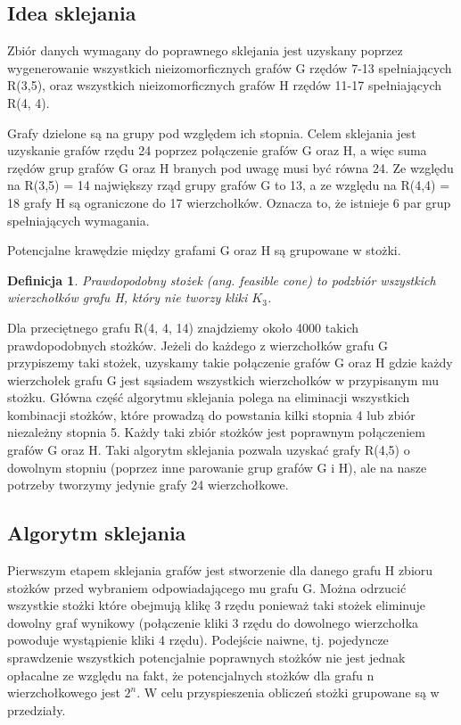 \documentclass[11pt]{article}
\newtheorem{definition}{Definicja}[section]
\begin{document}
\subsection{Idea sklejania}
Zbiór danych wymagany do poprawnego sklejania jest uzyskany poprzez wygenerowanie wszystkich nieizomorficznych grafów G rzędów 7-13 spełniających R(3,5), oraz wszystkich nieizomorficznych grafów H rzędów 11-17 spełniających R(4, 4).

Grafy dzielone są na grupy pod względem ich stopnia. Celem sklejania jest uzyskanie grafów rzędu 24 poprzez połączenie grafów G oraz H, a więc suma rzędów grup grafów G oraz H branych pod uwagę musi być równa 24. Ze względu na R(3,5) = 14 największy rząd grupy grafów G to 13, a ze względu na R(4,4) = 18 grafy H są ograniczone do 17 wierzchołków. Oznacza to, że istnieje 6 par grup spełniających wymagania.

Potencjalne krawędzie między grafami G oraz H są grupowane w stożki.

\begin{definition}
Prawdopodobny stożek (ang. feasible cone) to podzbiór wszystkich wierzchołków grafu H, który nie tworzy kliki $K_3$.
\end{definition}

Dla przeciętnego grafu R(4, 4, 14) znajdziemy około 4000 takich prawdopodobnych stożków. Jeżeli do każdego z wierzchołków grafu G przypiszemy taki stożek, uzyskamy takie połączenie grafów G oraz H gdzie każdy wierzchołek grafu G jest sąsiadem wszystkich wierzchołków w przypisanym mu stożku. Główna część algorytmu sklejania polega na eliminacji wszystkich kombinacji stożków, które prowadzą do powstania kilki stopnia 4 lub zbiór niezależny stopnia 5. Każdy taki zbiór stożków jest poprawnym połączeniem grafów G oraz H. Taki algorytm sklejania pozwala uzyskać grafy R(4,5) o dowolnym stopniu (poprzez inne parowanie grup grafów G i H), ale na nasze potrzeby tworzymy jedynie grafy 24 wierzchołkowe.




\subsection{Algorytm sklejania}
Pierwszym etapem sklejania grafów jest stworzenie dla danego grafu H zbioru stożków przed wybraniem odpowiadającego mu grafu G. Można odrzucić wszystkie stożki które obejmują klikę 3 rzędu ponieważ taki stożek eliminuje dowolny graf wynikowy (połączenie kliki 3 rzędu do dowolnego wierzchołka powoduje wystąpienie kliki 4 rzędu). Podejście naiwne, tj. pojedyncze sprawdzenie wszystkich potencjalnie poprawnych stożków nie jest jednak opłacalne ze względu na fakt, że potencjalnych stożków dla grafu n wierzchołkowego jest $2^n$. W celu przyspieszenia obliczeń stożki grupowane są w przedziały. 
\end{document}
